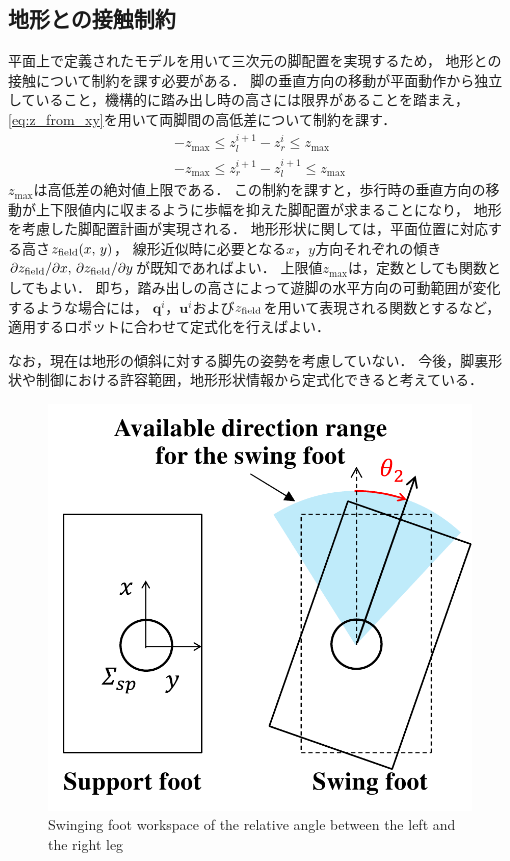 \documentclass[autodetect-engine,dvipdfmx-if-dvi,ja=standard,a4j,jbase=11pt,magstyle=nomag*]{bxjsreport}
\begin{document}
\subsection{地形との接触制約}
\label{subseq:field_contact_constraint}
平面上で定義されたモデルを用いて三次元の脚配置を実現するため，
地形との接触について制約を課す必要がある．
脚の垂直方向の移動が平面動作から独立していること，機構的に踏み出し時の高さには限界があることを踏まえ，
\cref{eq:z_from_xy}を用いて両脚間の高低差について制約を課す．
\begin{equation} \label{eq:z_field_const}
    \begin{gathered}
        -z_{\mathrm{max}} \leq z_l^{i + 1} - z_r^i \leq z_{\mathrm{max}} \\
        -z_{\mathrm{max}} \leq z_r^{i + 1} - z_l^{i + 1} \leq z_{\mathrm{max}}
    \end{gathered}
\end{equation}
$z_{\mathrm{max}}$は高低差の絶対値上限である．
この制約を課すと，歩行時の垂直方向の移動が上下限値内に収まるように歩幅を抑えた脚配置が求まることになり，
地形を考慮した脚配置計画が実現される．
地形形状に関しては，平面位置に対応する高さ$z_{\mathrm{field}} ( x ,\, y )$，
線形近似時に必要となる$x$，$y$方向それぞれの傾き$\partial z_{\mathrm{field}} / \partial x ,\, \partial z_{\mathrm{field}} / \partial y$が既知であればよい．
上限値$z_{\mathrm{max}}$は，定数としても関数としてもよい．
即ち，踏み出しの高さによって遊脚の水平方向の可動範囲が変化するような場合には，
$\bm{q}^i$，$\bm{u}^i$および$z_{\mathrm{field}}$を用いて表現される関数とするなど，
適用するロボットに合わせて定式化を行えばよい．

なお，現在は地形の傾斜に対する脚先の姿勢を考慮していない．
今後，脚裏形状や制御における許容範囲，地形形状情報から定式化できると考えている．

\begin{figure}[t]
    \centering
    \includegraphics[width=0.75\linewidth, clip]{./figure/const_angle.pdf}
    \caption{Swinging foot workspace of the relative angle between the left and the right leg}
    \label{fig:const_angle}
\end{figure}
\end{document}
